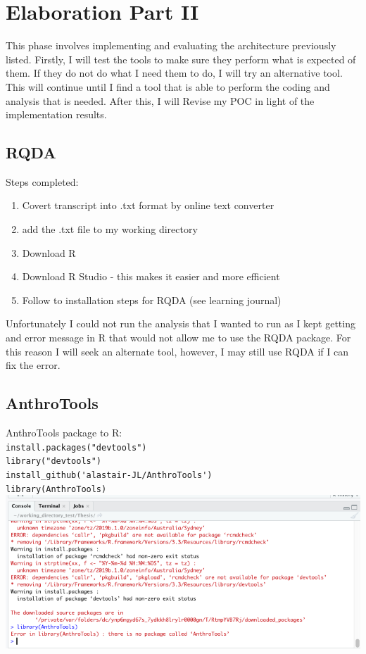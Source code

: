 \documentclass{article}
\begin{document}
\section{Elaboration Part II}
This phase involves implementing and evaluating the architecture previously listed. Firstly, I will test the tools to make sure they perform what is expected of them. If they do not do what I need them to do, I will try an alternative tool. This will continue until I find a tool that is able to perform the coding and analysis that is needed. After this, I will Revise my POC in light of the implementation results. 

\subsection{RQDA}
Steps completed:
\begin{enumerate}
    \item Covert transcript into .txt format by online text converter 
    \item add the .txt file to my working directory
    \item Download R 
    \item Download R Studio - this makes it easier and more efficient 
    \item Follow to installation steps for RQDA (see learning journal)
\end{enumerate}

Unfortunately I could not run the analysis that I wanted to run as I kept getting and error message in R that would not allow me to use the RQDA package. For this reason I will seek an alternate tool, however, I may still use RQDA if I can fix the error. 

\subsection{AnthroTools}
AnthroTools package to R:\\
\verb|install.packages("devtools")|\\
\verb|library("devtools")|\\
\verb|install_github('alastair-JL/AnthroTools')|\\
\verb|library(AnthroTools)|\\

\includegraphics[width=\textwidth]{AnthroTools.png}
\end{document}
